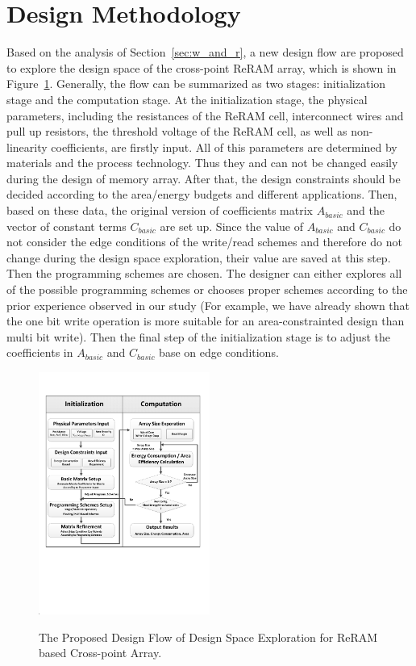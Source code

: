 \vspace{10pt}
\section{Design Methodology}\label{sec:framwork}
Based on the analysis of Section~\ref{sec:w_and_r}, a new design flow are proposed to explore the design space of the cross-point ReRAM array, which  is shown in Figure~\ref{fig:FlowChart}. Generally, the flow can be summarized as two stages: initialization stage and the computation stage. At the initialization stage, the physical parameters, including the resistances of the ReRAM cell, interconnect wires and pull up resistors, the threshold voltage of the ReRAM cell, as well as non-linearity coefficients, are firstly input. All of this parameters are determined by materials and the process technology. Thus they and can not be changed easily during the design of memory array. After that, the design constraints should be decided according to the area/energy budgets and different applications. Then, based on these data, the original version of coefficients matrix $A_{basic}$ and the vector of constant terms $C_{basic}$ are set up. Since the value of $A_{basic}$ and $C_{basic}$ do not consider the edge conditions of the write/read schemes and therefore do not change during the design space exploration, their value are saved at this step. Then the programming schemes are chosen. The designer can either explores all of the possible programming schemes or chooses proper schemes according to the prior experience observed in our study (For example, we have already shown that the one bit write operation is more suitable for an area-constrainted design than multi bit write). Then the final step of the initialization stage is to adjust the coefficients in $A_{basic}$ and $C_{basic}$ base on edge conditions. 



\begin{figure}[!t]
\centering
  \includegraphics[width=0.5\textwidth]{./figures/FlowChart.pdf}\\
  \caption{The Proposed Design Flow of Design Space Exploration for ReRAM based Cross-point Array.}\label{fig:FlowChart}
\end{figure}
